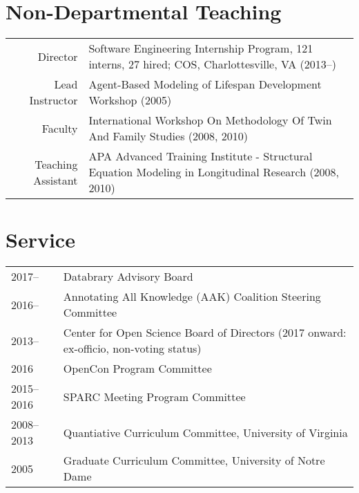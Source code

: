 \documentclass[11pt]{article}
\begin{document}
\section*{Non-Departmental Teaching}
\begin{tabularx}{\textwidth}{rX}
   Director		& \textbullet \hspace{.25em} Software Engineering Internship Program, 121 interns, 27 hired; COS, Charlottesville, VA (2013--)\\
    Lead Instructor		& \textbullet \hspace{.25em} Agent-Based Modeling of Lifespan Development Workshop (2005)\\
    Faculty						& \textbullet \hspace{.25em} International Workshop On Methodology Of Twin And Family Studies (2008, 2010)\\
    Teaching Assistant	& \textbullet \hspace{.25em} APA Advanced Training Institute - Structural Equation Modeling in Longitudinal Research (2008, 2010)\\
\end{tabularx}

\section*{Service}
\begin{tabularx}{\textwidth}{lX}
2017--				& Databrary Advisory Board\\
2016--      		& Annotating All Knowledge (AAK) Coalition Steering Committee\\
2013--				& Center for Open Science Board of Directors (2017 onward: ex-officio, non-voting status)\\
2016	      		& OpenCon Program Committee\\
2015--2016  	& SPARC Meeting Program Committee\\
2008--2013  	& Quantiative Curriculum Committee, University of Virginia\\
2005        		& Graduate Curriculum Committee, University of Notre Dame\\
\end{tabularx}
\end{document}
